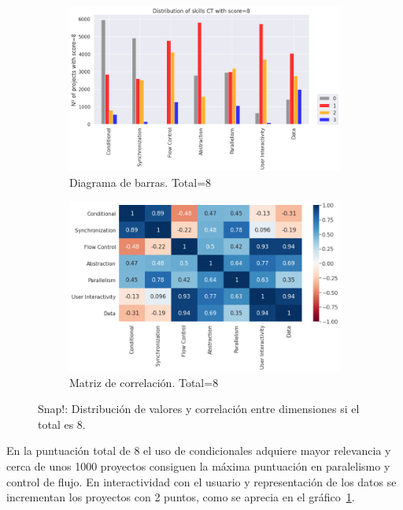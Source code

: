 \documentclass[a4paper, 12pt]{book}
\begin{document}
\begin{figure}[H]
    \centering
    \begin{subfigure}[h]{.49\textwidth} 
        \includegraphics[width=\textwidth]{img/distribucion_8_Snap}
        \caption{Diagrama de barras. Total=8}
        \label{fig:total8_Snap}
    \end{subfigure}       
    \begin{subfigure}[h]{.49\textwidth} 
        \includegraphics[width=\textwidth]{img/corr_8_Snap}
        \caption{Matriz de correlación. Total=8}
        \label{fig:corr8_Snap}
    \end{subfigure}
    \caption{Snap!: Distribución de valores y correlación entre dimensiones si el total es 8.}
\end{figure}

En la puntuación total de 8 el uso de condicionales adquiere mayor relevancia y cerca de unos 1000 proyectos consiguen la máxima puntuación en paralelismo y control de flujo. En interactividad con el usuario y representación de los datos se incrementan los proyectos con 2 puntos, como se aprecia en el gráfico~\ref{fig:total8_Snap}.
\end{document}
